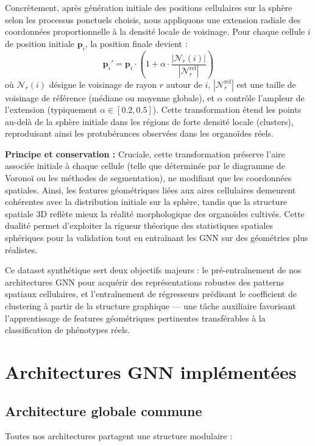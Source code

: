 Concrètement, après génération initiale des positions cellulaires sur la sphère selon les processus ponctuels choisis, nous appliquons une extension radiale des coordonnées proportionnelle à la densité locale de voisinage. Pour chaque cellule $i$ de position initiale $\mathbf{p}_i$, la position finale devient :
\[
\mathbf{p}_i' = \mathbf{p}_i \cdot \left(1 + \alpha \cdot \frac{|\mathcal{N}_r(i)|}{|\mathcal{N}_r^{\text{ref}}|}\right)
\]
où $\mathcal{N}_r(i)$ désigne le voisinage de rayon $r$ autour de $i$, $|\mathcal{N}_r^{\text{ref}}|$ est une taille de voisinage de référence (médiane ou moyenne globale), et $\alpha$ contrôle l'ampleur de l'extension (typiquement $\alpha \in [0.2, 0.5]$). Cette transformation étend les points au-delà de la sphère initiale dans les régions de forte densité locale (clusters), reproduisant ainsi les protubérances observées dans les organoïdes réels.

\textbf{Principe et conservation :}
Cruciale, cette transformation préserve l'aire associée initiale à chaque cellule (telle que déterminée par le diagramme de Voronoï ou les méthodes de segmentation), ne modifiant que les coordonnées spatiales. Ainsi, les features géométriques liées aux aires cellulaires demeurent cohérentes avec la distribution initiale sur la sphère, tandis que la structure spatiale 3D reflète mieux la réalité morphologique des organoïdes cultivés. Cette dualité permet d'exploiter la rigueur théorique des statistiques spatiales sphériques pour la validation tout en entraînant les GNN sur des géométries plus réalistes.

Ce dataset synthétique sert deux objectifs majeurs : le pré-entraînement de nos architectures GNN pour acquérir des représentations robustes des patterns spatiaux cellulaires, et l'entraînement de régresseurs prédisant le coefficient de clustering à partir de la structure graphique — une tâche auxiliaire favorisant l'apprentissage de features géométriques pertinentes transférables à la classification de phénotypes réels.

\section{Architectures GNN implémentées}

\subsection{Architecture globale commune}

Toutes nos architectures partagent une structure modulaire :

